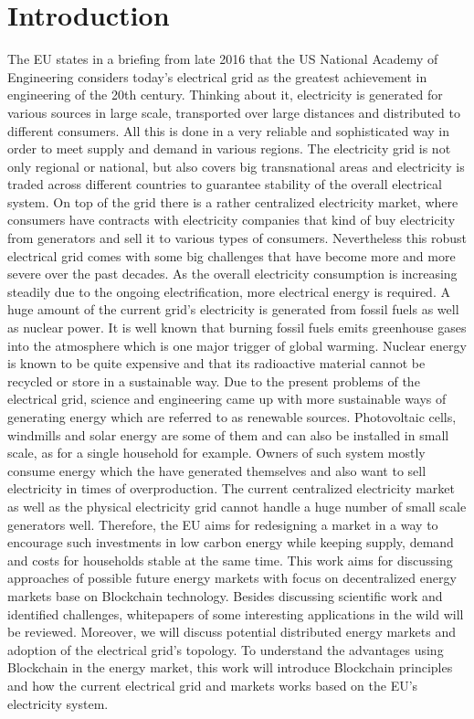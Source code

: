 \documentclass[runningheads]{llncs}
\begin{document}
\section{Introduction}
The EU states in a briefing from late 2016 \cite{eu_energy_market} that the US National Academy of Engineering considers today's electrical grid as the greatest achievement in engineering of the 20th century. Thinking about it, electricity is generated for various sources in large scale, transported over large distances and distributed to different consumers. All this is done in a very reliable and sophisticated way in order to meet supply and demand in various regions. The electricity grid is not only regional or national, but also covers big transnational areas and electricity is traded across different countries to guarantee stability of the overall electrical system. On top of the grid there is a rather centralized electricity market, where consumers have contracts with electricity companies that kind of buy electricity from generators and sell it to various types of consumers. \newline
Nevertheless this robust electrical grid comes with some big challenges that have become more and more severe over the past decades. As the overall electricity consumption is increasing steadily due to the ongoing electrification, more electrical energy is required. A huge amount of the current grid's electricity is generated from fossil fuels as well as nuclear power. It is well known that burning fossil fuels emits greenhouse gases into the atmosphere which is one major trigger of global warming. Nuclear energy is known to be quite expensive and that its radioactive material cannot be recycled or store in a sustainable way. \newline
Due to the present problems of the electrical grid, science and engineering came up with more sustainable ways of generating energy which are referred to as renewable sources. Photovoltaic cells, windmills and solar energy are some of them and can also be installed in small scale, as for a single household for example. Owners of such system mostly consume energy which the have generated themselves and also want to sell electricity in times of overproduction. The current centralized electricity market as well as the physical electricity grid cannot handle a huge number of small scale generators well. Therefore, the EU \cite{eu_energy_market} aims for redesigning a market in a way to encourage such investments in low carbon energy while keeping supply, demand and costs for households stable at the same time. \newline
This work aims for discussing approaches of possible future energy markets with focus on decentralized energy markets base on Blockchain technology. Besides discussing scientific work and identified challenges, whitepapers of some interesting applications in the wild will be reviewed. Moreover, we will discuss potential distributed energy markets and adoption of the electrical grid's topology. To understand the advantages using Blockchain in the energy market, this work will introduce Blockchain principles and how the current electrical grid and markets works based on the EU's electricity system.
\end{document}
